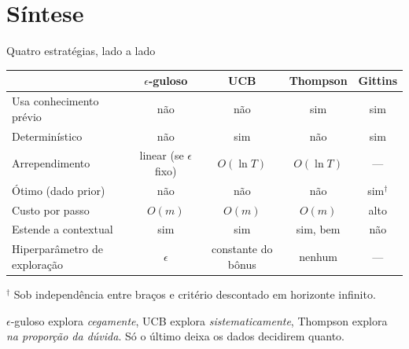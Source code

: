 \documentclass[aspectratio=169, 11pt]{beamer}
\begin{document}
\section{Síntese}

\begin{frame}{Quatro estratégias, lado a lado}
  \begin{center}\small
  \begin{tabular}{@{}lcccc@{}}
    \toprule
     & \textbf{$\epsilon$-guloso} & \textbf{UCB} & \textbf{Thompson} & \textbf{Gittins} \\
    \midrule
    Usa conhecimento prévio       & não & não & \alert{sim} & \alert{sim} \\
    Determinístico                & não & \alert{sim} & não & \alert{sim} \\
    Arrependimento                & linear (se $\epsilon$ fixo) & $O(\ln T)$ & $O(\ln T)$ & --- \\
    Ótimo (dado prior)            & não & não & não & \alert{sim}$^{\dagger}$ \\
    Custo por passo               & $O(m)$ & $O(m)$ & $O(m)$ & alto \\
    Estende a contextual          & sim & sim & \alert{sim, bem} & não \\
    Hiperparâmetro de exploração  & $\epsilon$ & constante do bônus & \alert{nenhum} & --- \\
    \bottomrule
  \end{tabular}
  \end{center}

  \smallskip
  {\footnotesize $^{\dagger}$ Sob independência entre braços e critério
  descontado em horizonte infinito.}

  \begin{ideiabox}
    $\epsilon$-guloso explora \emph{cegamente}, UCB explora
    \emph{sistematicamente}, Thompson explora \emph{na proporção da
    dúvida}. Só o último deixa os dados decidirem quanto.
  \end{ideiabox}
\end{frame}
\end{document}
